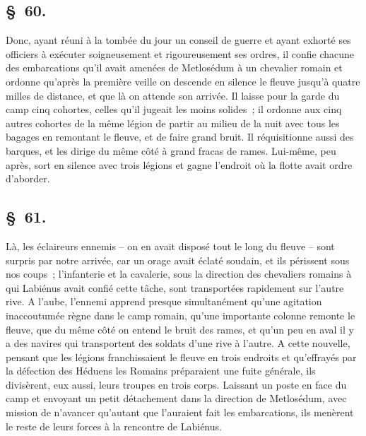 \documentclass[french,twoside]{book} %
\begin{document}
\subsection[{§ 60.}]{ \textsc{§ 60.} }
\noindent Donc, ayant réuni à la tombée du jour un conseil de guerre et ayant exhorté ses officiers à exécuter soigneusement et rigoureusement ses ordres, il confie chacune des embarcations qu’il avait amenées de Metlosédum à un chevalier romain et ordonne qu’après la première veille on descende en silence le fleuve jusqu’à quatre milles de distance, et que là on attende son arrivée. Il laisse pour la garde du camp cinq cohortes, celles qu’il jugeait les moins solides ; il ordonne aux cinq autres cohortes de la même légion de partir au milieu de la nuit avec tous les bagages en remontant le fleuve, et de faire grand bruit. Il réquisitionne aussi des barques, et les dirige du même côté à grand fracas de rames. Lui-même, peu après, sort en silence avec trois légions et gagne l’endroit où la flotte avait ordre d’aborder.
\subsection[{§ 61.}]{ \textsc{§ 61.} }
\noindent Là, les éclaireurs ennemis – on en avait disposé tout le long du fleuve – sont surpris par notre arrivée, car un orage avait éclaté soudain, et ils périssent sous nos coups ; l’infanterie et la cavalerie, sous la direction des chevaliers romains à qui Labiénus avait confié cette tâche, sont transportées rapidement sur l’autre rive. A l’aube, l’ennemi apprend presque simultanément qu’une agitation inaccoutumée règne dans le camp romain, qu’une importante colonne remonte le fleuve, que du même côté on entend le bruit des rames, et qu’un peu en aval il y a des navires qui transportent des soldats d’une rive à l’autre. A cette nouvelle, pensant que les légions franchissaient le fleuve en trois endroits et qu’effrayés par la défection des Héduens les Romains préparaient une fuite générale, ils divisèrent, eux aussi, leurs troupes en trois corps. Laissant un poste en face du camp et envoyant un petit détachement dans la direction de Metlosédum, avec mission de n’avancer qu’autant que l’auraient fait les embarcations, ils menèrent le reste de leurs forces à la rencontre de Labiénus.
\end{document}
